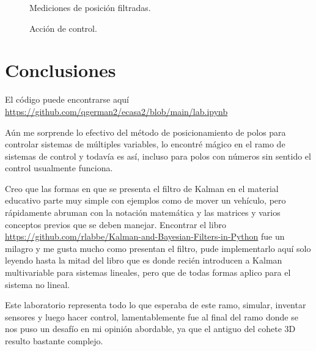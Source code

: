 \documentclass[titlepage, letterpaper]{article}
\begin{document}
\begin{figure}[H]
	\centering
	
	\caption{Mediciones de posición filtradas.}
\end{figure}

\begin{figure}[H]
	\centering
	
	\caption{Acción de control.}
\end{figure}

\section{Conclusiones}

El código puede encontrarse aquí \url{https://github.com/qgerman2/ecasa2/blob/main/lab.ipynb}

Aún me sorprende lo efectivo del método de posicionamiento de polos para controlar sistemas de múltiples variables, lo encontré mágico en el ramo de sistemas de control y todavía es así, incluso para polos con números sin sentido el control usualmente funciona.

Creo que las formas en que se presenta el filtro de Kalman en el material educativo parte muy simple con ejemplos como de mover un vehículo, pero rápidamente abruman con la notación matemática y las matrices y varios conceptos previos que se deben manejar. Encontrar el libro \url{https://github.com/rlabbe/Kalman-and-Bayesian-Filters-in-Python} fue un milagro y me gusta mucho como presentan el filtro, pude implementarlo aquí solo leyendo hasta la mitad del libro que es donde recién introducen a Kalman multivariable para sistemas lineales, pero que de todas formas aplico para el sistema no lineal.

Este laboratorio representa todo lo que esperaba de este ramo, simular, inventar sensores y luego hacer control, lamentablemente fue al final del ramo donde se nos puso un desafío en mi opinión abordable, ya que el antiguo del cohete 3D resulto bastante complejo.
\end{document}

